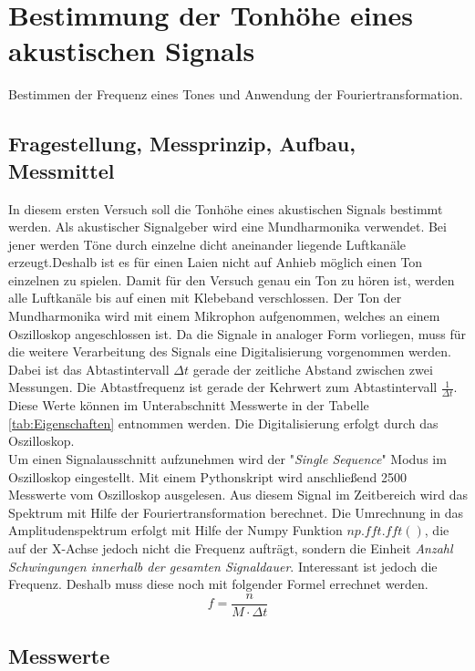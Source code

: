 %
%
\chapter{Bestimmung der Tonhöhe eines akustischen Signals}
\label{chap:VERSUCH_1}
Bestimmen der Frequenz eines Tones und Anwendung der Fouriertransformation.
 
\section{Fragestellung, Messprinzip, Aufbau, Messmittel}
\label{chap:VERSUCH_1_FRAGESTELLUNG}
In diesem ersten Versuch soll die Tonhöhe eines akustischen Signals bestimmt werden. Als akustischer Signalgeber wird eine Mundharmonika verwendet. Bei jener werden Töne durch einzelne dicht aneinander liegende Luftkanäle erzeugt.Deshalb ist es für einen Laien nicht auf Anhieb möglich einen Ton einzelnen zu spielen. Damit für den Versuch genau ein Ton zu hören ist, werden alle Luftkanäle bis auf einen mit Klebeband verschlossen.
Der Ton der Mundharmonika wird mit einem Mikrophon aufgenommen, welches an einem Oszilloskop angeschlossen ist. 
Da die Signale in analoger Form vorliegen, muss für die weitere Verarbeitung des Signals eine Digitalisierung vorgenommen werden.
Dabei ist das Abtastintervall $\Delta t$ gerade der zeitliche Abstand zwischen zwei Messungen. Die Abtastfrequenz ist gerade der Kehrwert zum Abtastintervall $\frac{1}{\Delta t}$. Diese Werte können im Unterabschnitt Messwerte in der Tabelle \ref{tab:Eigenschaften} entnommen werden. Die Digitalisierung erfolgt durch das Oszilloskop.
\\
Um einen Signalausschnitt aufzunehmen wird der "\textit{Single Sequence}" Modus im Oszilloskop eingestellt. Mit einem Pythonskript wird anschließend 2500 Messwerte vom Oszilloskop ausgelesen.
Aus diesem Signal im Zeitbereich wird das Spektrum mit Hilfe der Fouriertransformation berechnet. Die Umrechnung in das Amplitudenspektrum erfolgt mit Hilfe der Numpy Funktion $np.fft.fft()$, die auf der X-Achse jedoch nicht die Frequenz aufträgt, sondern die Einheit \textit{Anzahl Schwingungen innerhalb der gesamten Signaldauer}. Interessant ist jedoch die Frequenz. Deshalb muss diese noch mit folgender Formel errechnet werden.
\begin{equation}
f = \dfrac{n}{M \cdot \Delta t}
\end{equation}




\section{Messwerte}
\label{chap:VERSUCH_1_MESSWERTE}


